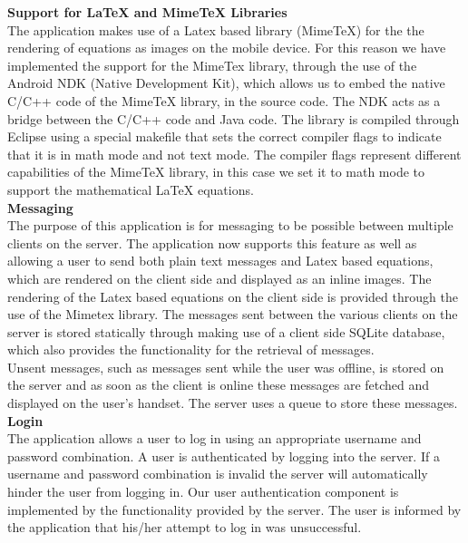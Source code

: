 \documentclass[29pt,a4paper]{moderncv}
\begin{document}
		\noindent\textbf{Support for LaTeX and MimeTeX Libraries}
		\\The application makes use of a Latex based library (MimeTeX) for the the rendering of equations as images on the mobile device.  For this reason we have implemented the support for the MimeTex library, through the use of the Android NDK (Native Development Kit), which allows us to embed the native C/C++ code of the MimeTeX library, in the source code. 
		\parindent 5mm The NDK acts as a bridge between the C/C++ code and Java code. The library is compiled through Eclipse using a special makefile that sets the correct compiler flags to indicate that it is in math mode and not text mode. The compiler flags represent different capabilities of the MimeTeX library, in this case we set it to math mode to support the mathematical LaTeX equations.\\
		
		
		\noindent\textbf{Messaging}
		\\The purpose of this application is for messaging to be possible between multiple clients on the server. The application now supports this feature as well as allowing a user to send both plain text messages and Latex based equations, which are rendered on the client side and displayed as an inline images.
		\parindent 5mm The rendering of the Latex based equations on the client side is provided through the use of the Mimetex library. The messages sent between the various clients on the server is stored statically through making use of a client side SQLite database, which also provides the functionality for the retrieval of messages.
		\\Unsent messages, such as messages sent while the user was offline, is stored on the server and as soon as the client is online these messages are fetched and displayed on the user's handset. The server uses a queue to store these messages.\\
		
		\noindent\textbf{Login}
		\\The application allows a user to log in using an appropriate username and password combination. A user is authenticated by logging into the server.  If a username and password combination is invalid the server will automatically hinder the user from logging in. Our user authentication component is implemented by the functionality provided by the server. The user is informed by the application that his/her attempt to log in was unsuccessful.\\
		
\end{document}
